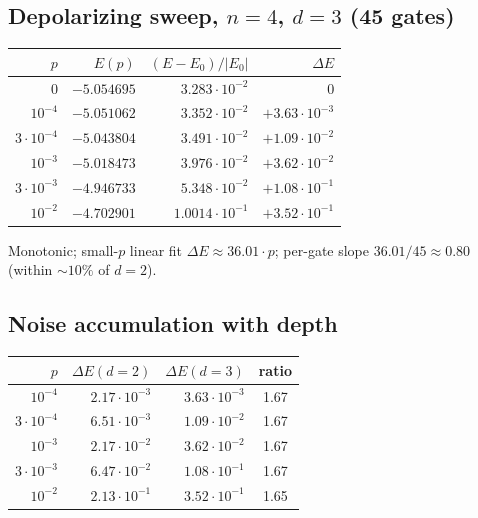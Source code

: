 \documentclass[11pt]{article}
\begin{document}
\subsection{Depolarizing sweep, $n=4$, $d=3$ (45 gates)}
\begin{center}
\begin{tabular}{rrrr}
\toprule
$p$ & $E(p)$ & $(E-E_0)/|E_0|$ & $\Delta E$ \\
\midrule
0        & $-5.054695$ & $3.283\!\cdot\!10^{-2}$ & 0 \\
$10^{-4}$ & $-5.051062$ & $3.352\!\cdot\!10^{-2}$ & $+3.63\!\cdot\!10^{-3}$ \\
$3\!\cdot\!10^{-4}$ & $-5.043804$ & $3.491\!\cdot\!10^{-2}$ & $+1.09\!\cdot\!10^{-2}$ \\
$10^{-3}$ & $-5.018473$ & $3.976\!\cdot\!10^{-2}$ & $+3.62\!\cdot\!10^{-2}$ \\
$3\!\cdot\!10^{-3}$ & $-4.946733$ & $5.348\!\cdot\!10^{-2}$ & $+1.08\!\cdot\!10^{-1}$ \\
$10^{-2}$ & $-4.702901$ & $1.0014\!\cdot\!10^{-1}$ & $+3.52\!\cdot\!10^{-1}$ \\
\bottomrule
\end{tabular}
\end{center}

Monotonic; small-$p$ linear fit $\Delta E \approx 36.01 \cdot p$; per-gate slope $36.01/45 \approx 0.80$
(within $\sim 10\%$ of $d=2$).

\subsection{Noise accumulation with depth}
\begin{center}
\begin{tabular}{rrrc}
\toprule
$p$ & $\Delta E(d=2)$ & $\Delta E(d=3)$ & ratio \\
\midrule
$10^{-4}$ & $2.17\!\cdot\!10^{-3}$ & $3.63\!\cdot\!10^{-3}$ & 1.67 \\
$3\!\cdot\!10^{-4}$ & $6.51\!\cdot\!10^{-3}$ & $1.09\!\cdot\!10^{-2}$ & 1.67 \\
$10^{-3}$ & $2.17\!\cdot\!10^{-2}$ & $3.62\!\cdot\!10^{-2}$ & 1.67 \\
$3\!\cdot\!10^{-3}$ & $6.47\!\cdot\!10^{-2}$ & $1.08\!\cdot\!10^{-1}$ & 1.67 \\
$10^{-2}$ & $2.13\!\cdot\!10^{-1}$ & $3.52\!\cdot\!10^{-1}$ & 1.65 \\
\bottomrule
\end{tabular}
\end{center}
\end{document}
